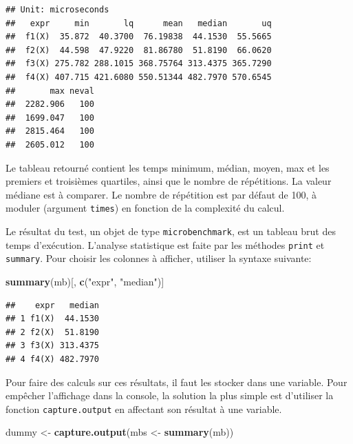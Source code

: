 \documentclass[
  12pt,
  french,
  a4paper,
  extrafontsizes,onecolumn,openright
  ]{memoir}
\newenvironment{Shaded}{\begin{snugshade}}{\end{snugshade}}
\newcommand{\KeywordTok}[1]{\textcolor[rgb]{0.13,0.29,0.53}{\textbf{#1}}}
\newcommand{\NormalTok}[1]{#1}
\newcommand{\StringTok}[1]{\textcolor[rgb]{0.31,0.60,0.02}{#1}}
\begin{document}
\begin{verbatim}
## Unit: microseconds
##   expr     min       lq      mean   median       uq
##  f1(X)  35.872  40.3700  76.19838  44.1530  55.5665
##  f2(X)  44.598  47.9220  81.86780  51.8190  66.0620
##  f3(X) 275.782 288.1015 368.75764 313.4375 365.7290
##  f4(X) 407.715 421.6080 550.51344 482.7970 570.6545
##       max neval
##  2282.906   100
##  1699.047   100
##  2815.464   100
##  2605.012   100
\end{verbatim}

\normalsize

Le tableau retourné contient les temps minimum, médian, moyen, max et les premiers et troisièmes quartiles, ainsi que le nombre de répétitions.
La valeur médiane est à comparer.
Le nombre de répétition est par défaut de 100, à moduler (argument \texttt{times}) en fonction de la complexité du calcul.

Le résultat du test, un objet de type \texttt{microbenchmark}, est un tableau brut des temps d'exécution.
L'analyse statistique est faite par les méthodes \texttt{print} et \texttt{summary}.
Pour choisir les colonnes à afficher, utiliser la syntaxe suivante:

\scriptsize

\begin{Shaded}
\begin{Highlighting}[]
\KeywordTok{summary}\NormalTok{(mb)[, }\KeywordTok{c}\NormalTok{(}\StringTok{"expr"}\NormalTok{, }\StringTok{"median"}\NormalTok{)]}
\end{Highlighting}
\end{Shaded}

\begin{verbatim}
##    expr   median
## 1 f1(X)  44.1530
## 2 f2(X)  51.8190
## 3 f3(X) 313.4375
## 4 f4(X) 482.7970
\end{verbatim}

\normalsize

Pour faire des calculs sur ces résultats, il faut les stocker dans une variable.
Pour empêcher l'affichage dans la console, la solution la plus simple est d'utiliser la fonction \texttt{capture.output} en affectant son résultat à une variable.

\scriptsize

\begin{Shaded}
\begin{Highlighting}[]
\NormalTok{dummy <-}\StringTok{ }\KeywordTok{capture.output}\NormalTok{(mbs <-}\StringTok{ }\KeywordTok{summary}\NormalTok{(mb))}
\end{Highlighting}
\end{Shaded}
\end{document}
